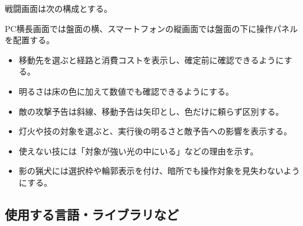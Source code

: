\documentclass[a4paper,11pt,dvipdfmx]{jsarticle}
\begin{document}
戦闘画面は次の構成とする。

\begin{center}
\end{center}

PC横長画面では盤面の横、スマートフォンの縦画面では盤面の下に操作パネルを配置する。

\begin{itemize}
\item 移動先を選ぶと経路と消費コストを表示し、確定前に確認できるようにする。
\item 明るさは床の色に加えて数値でも確認できるようにする。
\item 敵の攻撃予告は斜線、移動予告は矢印とし、色だけに頼らず区別する。
\item 灯火や技の対象を選ぶと、実行後の明るさと敵予告への影響を表示する。
\item 使えない技には「対象が強い光の中にいる」などの理由を示す。
\item 影の猟犬には選択枠や輪郭表示を付け、暗所でも操作対象を見失わないようにする。
\end{itemize}

\subsection{使用する言語・ライブラリなど}
\end{document}
